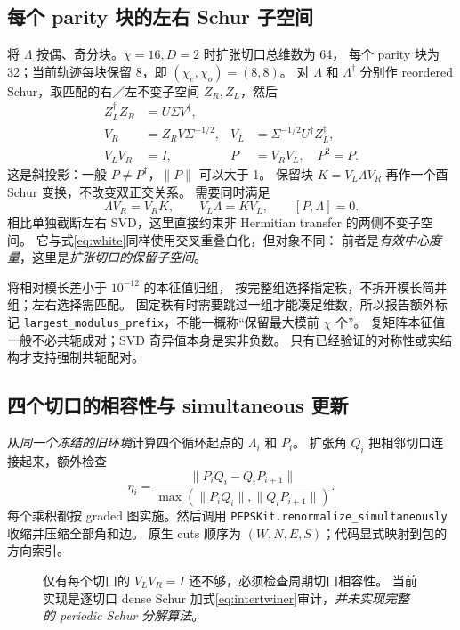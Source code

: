 \documentclass[11pt]{article}
\newcommand{\code}[1]{{\small\texttt{#1}}}
\begin{document}
\subsection{每个 parity 块的左右 Schur 子空间}
将 $\Lambda$ 按偶、奇分块。$\chi=16,D=2$ 时扩张切口总维数为 64，
每个 parity 块为 32；当前轨迹每块保留 8，即 $(\chi_e,\chi_o)=(8,8)$。
对 $\Lambda$ 和 $\Lambda^\dagger$ 分别作 reordered Schur，取匹配的右／左不变子空间
$Z_R,Z_L$，然后
\begin{align}
 Z_L^\dagger Z_R&=U\Sigma V^\dagger,\\
 V_R&=Z_RV\Sigma^{-1/2},&
 V_L&=\Sigma^{-1/2}U^\dagger Z_L^\dagger,\\
 V_LV_R&=I,& P&=V_RV_L,\quad P^2=P.
 \label{eq:oblique}
\end{align}
这是斜投影：一般 $P\ne P^\dagger$，$\|P\|$ 可以大于 1。
保留块 $K=V_L\Lambda V_R$ 再作一个酉 Schur 变换，不改变双正交关系。
需要同时满足
\begin{equation}
 \Lambda V_R=V_RK,\qquad V_L\Lambda=KV_L,\qquad
 [P,\Lambda]=0.
 \label{eq:invariant}
\end{equation}
相比单独截断左右 SVD，这里直接约束非 Hermitian transfer 的两侧不变子空间。
它与式\eqref{eq:white}同样使用交叉重叠白化，但对象不同：
前者是\emph{有效中心度量}，这里是\emph{扩张切口的保留子空间}。

 将相对模长差小于 $10^{-12}$ 的本征值归组，
按完整组选择指定秩，不拆开模长简并组；左右选择需匹配。
固定秩有时需要跳过一组才能凑足维数，所以报告额外标记
\code{largest\_modulus\_prefix}，不能一概称“保留最大模前 $\chi$ 个”。
复矩阵本征值一般不必共轭成对；SVD 奇异值本身是实非负数。
只有已经验证的对称性或实结构才支持强制共轭配对。

\subsection{四个切口的相容性与 simultaneous 更新}
从\emph{同一个冻结的旧环境}计算四个循环起点的 $\Lambda_i$ 和 $P_i$。
扩张角 $Q_i$ 把相邻切口连接起来，额外检查
\begin{equation}
 \eta_i=\frac{\|P_iQ_i-Q_iP_{i+1}\|}
 {\max(\|P_iQ_i\|,\|Q_iP_{i+1}\|)}.
 \label{eq:intertwiner}
\end{equation}
每个乘积都按 graded 图实施。然后调用
\code{PEPSKit.renormalize\_simultaneously} 收缩并压缩全部角和边。
原生 cuts 顺序为 $(W,N,E,S)$；代码显式映射到包的方向索引。

\begin{figure}[htbp]\centering
{}
\caption{仅有每个切口的 $V_LV_R=I$ 还不够，必须检查周期切口相容性。
当前实现是逐切口 dense Schur 加式\eqref{eq:intertwiner}审计，\emph{并未实现完整的 periodic Schur 分解算法}。}
\end{figure}
\end{document}
